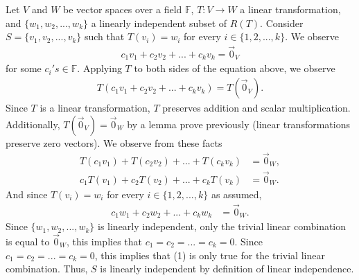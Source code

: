 \documentclass[12pt,answers]{exam}
\newcommand{\F}{\mathbb{F}}
\begin{document}
\begin{solution}
Let $V$ and $W$ be vector spaces over a field $\F$, $T:V\rightarrow W$ a linear transformation, and $\{w_{1},w_{2},...,w_{k}\}$ a linearly independent subset of $R(T)$. Consider $S=\{v_{1},v_{2},...,v_{k}\}$ such that $T(v_{i})=w_{i}$ for every $i \in \{1,2,...,k\}$. We observe
\begin{align}
	c_{1}v_{1}+c_{2}v_{2}+...+c_{k}v_{k}=\vec{0}_{V}
\end{align}
for some $c_{i}'s\in \F$. Applying $T$ to both sides of the equation above, we observe
\begin{align*}
	T(c_{1}v_{1}+c_{2}v_{2}+...+c_{k}v_{k})=T(\vec{0}_{V}).
\end{align*} 
Since $T$ is a linear transformation, $T$ preserves addition and scalar multiplication. Additionally, $T(\vec{0}_{V})=\vec{0}_{W}$ by a lemma prove previously (linear transformations preserve zero vectors). We observe from these facts
\begin{align*}
	T(c_{1}v_{1})+T(c_{2}v_{2})+...+T(c_{k}v_{k})&=\vec{0}_{W}, \\
	c_{1}T(v_{1})+c_{2}T(v_{2})+...+c_{k}T(v_{k})&=\vec{0}_{W}. 
\end{align*}
And since $T(v_{i})=w_{i}$ for every $i \in \{1,2,...,k\}$ as assumed,
\begin{align*}
	c_{1}w_{1}+c_{2}w_{2}+...+c_{k}w_{k}&=\vec{0}_{W}. 
\end{align*}
Since $\{w_{1},w_{2},...,w_{k}\}$ is linearly independent, only the trivial linear combination is equal to $\vec{0}_{W}$, this implies that $c_{1}=c_{2}=...=c_{k}=0$. Since $c_{1}=c_{2}=...=c_{k}=0$, this implies that (1) is only true for the trivial linear combination. Thus, $S$ is linearly independent by definition of linear independence.
\end{solution}
\end{document}
